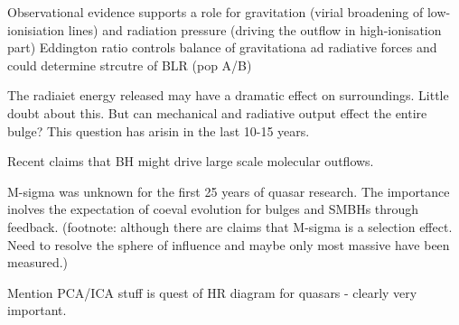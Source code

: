 Observational evidence supports a role for gravitation (virial broadening of low-ionisiation lines) and radiation pressure (driving the outflow in high-ionisation part) Eddington ratio controls balance of gravitationa ad radiative forces and could determine strcutre of BLR (pop A/B)

The radiaiet energy released may have a dramatic effect on surroundings. Little doubt about this. But can mechanical and radiative output effect the entire bulge? This question has arisin in the last 10-15 years. 

Recent claims that BH might drive large scale molecular outflows. 

M-sigma was unknown for the first 25 years of quasar research. The importance inolves the expectation of coeval evolution for bulges and SMBHs through feedback. (footnote: although there are claims that M-sigma is a selection effect. Need to resolve the sphere of influence and maybe only most massive have been measured.)

Mention PCA/ICA stuff is quest of HR diagram for quasars - clearly very important. 